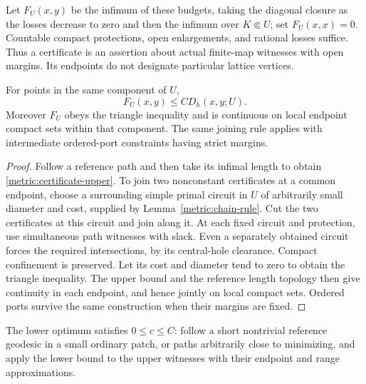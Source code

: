 Let \(F_U(x,y)\) be the infimum of these budgets, taking the diagonal
closure as the losses decrease to zero and then the infimum over
\(K\Subset U\); set \(F_U(x,x)=0\). Countable compact protections,
open enlargements, and rational losses suffice. Thus a certificate is an
assertion about actual finite-map witnesses with open margins. Its
endpoints do not designate particular lattice vertices.

\begin{lemma}\label{metric:certificate-joining}
For points in the same component of $U$,
\begin{equation}\label{metric:certificate-upper}
 F_U(x,y)\le C D_h(x,y;U).
\end{equation}
Moreover $F_U$ obeys the triangle inequality and is continuous on local
endpoint compact sets within that component. The same joining rule applies
with intermediate ordered-port constraints having strict margins.
\end{lemma}

\begin{proof}
Follow a reference path and then take its infimal length to obtain
\eqref{metric:certificate-upper}. To join two nonconstant certificates at a
common endpoint, choose a surrounding simple primal circuit in $U$ of
arbitrarily small diameter and cost, supplied by
Lemma~\ref{metric:chain-rule}. Cut the two certificates at this circuit and
join along it. At each fixed circuit and protection, use simultaneous path
witnesses with slack. Even a separately obtained circuit forces the required
intersections, by its central-hole clearance. Compact confinement is
preserved. Let its cost and diameter tend to zero to obtain the triangle
inequality. The upper bound and the reference length topology then give
continuity in each endpoint, and hence jointly on local compact sets.
Ordered ports survive the same construction when their margins are fixed.
\end{proof}

The lower optimum satisfies $0\le c\le C$: follow a short nontrivial reference
geodesic in a small ordinary patch, or paths arbitrarily close to minimizing,
and apply the lower bound to the upper witnesses with their endpoint and
range approximations.

